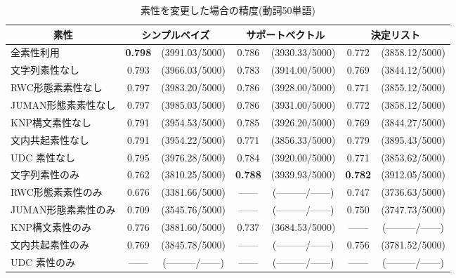 \begin{table*}[t]
\caption{素性を変更した場合の精度(動詞50単語)}
\label{tab:sosei_change_verb}
  \begin{center}
\small\renewcommand{\arraystretch}{}
\begin{tabular}[c]{|l@{ }|c@{ }c@{ }|c@{ }c@{ }|c@{ }c@{ }|}\hline
\multicolumn{1}{|c|}{素性}  & \multicolumn{2}{|c|}{シンプルベイズ} & \multicolumn{2}{|c|}{サポートベクトル} & \multicolumn{2}{|c|}{決定リスト}  \\\hline
全素性利用          & {\bf 0.798}  & (3991.03/5000)  & 0.786  & (3930.33/5000)  & 0.772  & (3858.12/5000) \\\hline
文字列素性なし      & 0.793  & (3966.03/5000)  & 0.783  & (3914.00/5000)  & 0.769  & (3844.12/5000) \\
RWC形態素素性なし   & 0.797  & (3983.20/5000)  & 0.786  & (3928.00/5000)  & 0.771  & (3855.12/5000) \\
JUMAN形態素素性なし & 0.797  & (3985.03/5000)  & 0.786  & (3931.00/5000)  & 0.772  & (3858.12/5000) \\
KNP構文素性なし     & 0.791  & (3954.53/5000)  & 0.785  & (3926.20/5000)  & 0.769  & (3844.27/5000) \\
文内共起素性なし    & 0.791  & (3954.22/5000)  & 0.771  & (3856.33/5000)  & 0.779  & (3895.43/5000) \\
UDC 素性なし        & 0.795  & (3976.28/5000)  & 0.784  & (3920.00/5000)  & 0.771  & (3853.62/5000) \\\hline
文字列素性のみ      & 0.762  & (3810.25/5000)  & {\bf 0.788}  & (3939.93/5000)  & {\bf 0.782}  & (3912.05/5000) \\
RWC形態素素性のみ   & 0.676  & (3381.66/5000)  & ------ & (---------/------) & 0.747  & (3736.63/5000)  \\
JUMAN形態素素性のみ & 0.709  & (3545.76/5000)  & ------ & (---------/------) & 0.750  & (3747.73/5000) \\
KNP構文素性のみ     & 0.776  & (3881.60/5000)  & 0.737  & (3684.53/5000)  & ------ & (---------/------) \\
文内共起素性のみ    & 0.769  & (3845.78/5000)  & ------ & (---------/------) & 0.756  & (3781.52/5000) \\
UDC 素性のみ        & ------ & (---------/------) & ------ & (---------/------) & ------ & (---------/------) \\\hline
\end{tabular}
\end{center}
\end{table*}

